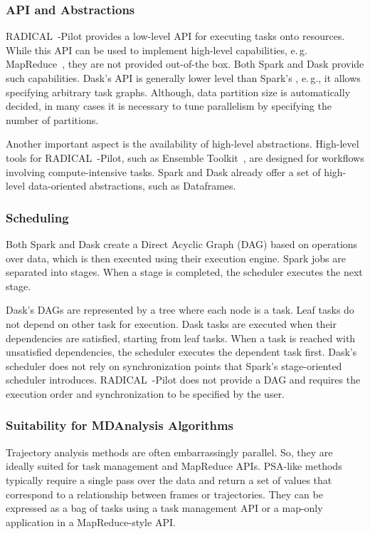 \subsubsection*{API and Abstractions} 
RADICAL~-Pilot provides a low-level API for executing tasks onto resources.
While this API can be used to implement high-level capabilities, e.\,g. MapReduce~\cite{mantha2012pilot}, they are not provided out-of-the box.
Both Spark and Dask provide such capabilities.
Dask's API is generally lower level than Spark's , e.\,g., it allows specifying arbitrary task graphs.
Although, data partition size is automatically decided, in many cases it is necessary to tune parallelism by specifying the number of partitions.

Another important aspect is the availability of high-level abstractions.
High-level tools for RADICAL~-Pilot, such as Ensemble Toolkit~\cite{balasubramanian2018harnessing}, are designed for workflows involving compute-intensive tasks.
Spark and Dask already offer a set of high-level data-oriented abstractions, such as Dataframes.

\subsubsection*{Scheduling}
Both Spark and Dask create a Direct Acyclic Graph (DAG) based on operations over data, which is then executed using their execution engine.
Spark jobs are separated into stages.
When a stage is completed, the scheduler executes the next stage.

Dask's DAGs are represented by a tree where each node is a task.
Leaf tasks do not depend on other task for execution.
Dask tasks are executed when their dependencies are satisfied, starting from leaf tasks.
When a task is reached with unsatisfied dependencies, the scheduler executes the dependent task first.
Dask's scheduler does not rely on synchronization points that Spark's stage-oriented scheduler introduces.
RADICAL~-Pilot does not provide a DAG and requires the execution order and synchronization to be specified by the user.

\subsubsection*{Suitability for MDAnalysis Algorithms}
Trajectory analysis methods are often embarrassingly parallel.
So, they are ideally suited for task management and MapReduce APIs.
PSA-like methods typically require a single pass over the data and return a set of values that correspond to a relationship between frames or trajectories.
They can be expressed as a bag of tasks using a task management API or a map-only application in a MapReduce-style API.

